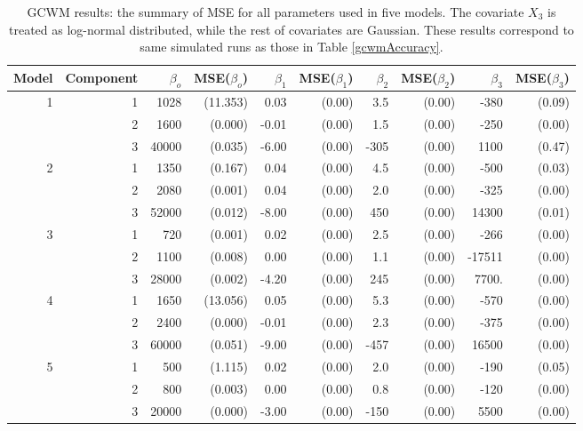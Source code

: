 \documentclass[11pt,letterpaper]{article}
\numberwithin{equation}{section}
\numberwithin{equation}{section}
\numberwithin{equation}{section}
\begin{document}
\begin{table}[h!]
\centering
\caption{ GCWM results: the summary of MSE for all parameters used in five models. The covariate $X_3$ is treated as log-normal distributed, while the rest of covariates are Gaussian. These results correspond to same simulated runs as those in Table \ref{gcwmAccuracy}.}
\label{mseTable}
\begin{tabular}{rrrrrrrrrr}
\hline\hline
Model & Component & $\beta_o$ &  MSE($\beta_o$)   &  $\beta_1$ & MSE($\beta_1$)& $\beta_2$ &MSE($\beta_2$)   & $\beta_3$ &  MSE($\beta_3$)  \\
\hline
1     & 1         & 1028& (11.353)   & 0.03& (0.00)  & 3.5& (0.00)    & -380& (0.09)   \\
      & 2         & 1600& (0.000)     & -0.01&(0.00) & 1.5&(0.00)    & -250&(0.00)   \\
      & 3         & 40000&(0.035)    & -6.00&(0.00) & -305&(0.00) & 1100&(0.47)   \\
2     & 1         & 1350&(0.167)     & 0.04&(0.00)  & 4.5&(0.00)    & -500&(0.03)   \\
      & 2         & 2080& (0.001)     & 0.04&(0.00)  & 2.0&(0.00)    & -325&(0.00)   \\
      & 3         & 52000& (0.012)    & -8.00&(0.00) & 450&(0.00)  & 14300&(0.01)  \\
3     & 1         & 720& (0.001)      & 0.02&(0.00)  & 2.5&(0.00)   & -266&(0.00)   \\
      & 2         & 1100& (0.008)     & 0.00&(0.00)  & 1.1&(0.00)    & -17511&(0.00) \\
      & 3         & 28000& (0.002)    & -4.20&(0.00) & 245&(0.00)  & 7700.&(0.00) \\
4     & 1         & 1650&(13.056)   & 0.05&(0.00)  & 5.3&(0.00)    & -570&(0.00)   \\
      & 2         & 2400& (0.000)     & -0.01&(0.00) & 2.3&(0.00)    & -375&(0.00)   \\
      & 3         & 60000& (0.051)    & -9.00&(0.00) & -457&(0.00) & 16500&(0.00)  \\
5     & 1         & 500& (1.115)     & 0.02&(0.00)  & 2.0&(0.00)    & -190&(0.05)   \\
      & 2         & 800& (0.003)      & 0.00&(0.00)  & 0.8&(0.00)    & -120&(0.00)   \\
      & 3         & 20000& (0.000)    & -3.00&(0.00) & -150&(0.00) & 5500&(0.00)  \\
      \hline\hline
\end{tabular}

\end{table}
\end{document}

